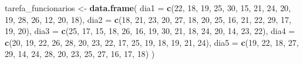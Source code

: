 \documentclass[
]{book}
\newenvironment{Shaded}{\begin{snugshade}}{\end{snugshade}}
\newcommand{\AttributeTok}[1]{\textcolor[rgb]{0.13,0.29,0.53}{#1}}
\newcommand{\DecValTok}[1]{\textcolor[rgb]{0.00,0.00,0.81}{#1}}
\newcommand{\FunctionTok}[1]{\textcolor[rgb]{0.13,0.29,0.53}{\textbf{#1}}}
\newcommand{\NormalTok}[1]{#1}
\newcommand{\OtherTok}[1]{\textcolor[rgb]{0.56,0.35,0.01}{#1}}
\begin{document}
\begin{Shaded}
\begin{Highlighting}[]
\NormalTok{tarefa\_funcionarios }\OtherTok{\textless{}{-}} \FunctionTok{data.frame}\NormalTok{(}
  \AttributeTok{dia1 =} \FunctionTok{c}\NormalTok{(}\DecValTok{22}\NormalTok{, }\DecValTok{18}\NormalTok{, }\DecValTok{19}\NormalTok{, }\DecValTok{25}\NormalTok{, }\DecValTok{30}\NormalTok{, }\DecValTok{15}\NormalTok{, }\DecValTok{21}\NormalTok{, }\DecValTok{24}\NormalTok{, }\DecValTok{20}\NormalTok{, }\DecValTok{19}\NormalTok{, }\DecValTok{28}\NormalTok{, }\DecValTok{26}\NormalTok{, }\DecValTok{12}\NormalTok{, }\DecValTok{20}\NormalTok{, }\DecValTok{18}\NormalTok{),}
  \AttributeTok{dia2 =} \FunctionTok{c}\NormalTok{(}\DecValTok{18}\NormalTok{, }\DecValTok{21}\NormalTok{, }\DecValTok{23}\NormalTok{, }\DecValTok{20}\NormalTok{, }\DecValTok{27}\NormalTok{, }\DecValTok{18}\NormalTok{, }\DecValTok{20}\NormalTok{, }\DecValTok{25}\NormalTok{, }\DecValTok{16}\NormalTok{, }\DecValTok{21}\NormalTok{, }\DecValTok{22}\NormalTok{, }\DecValTok{29}\NormalTok{, }\DecValTok{17}\NormalTok{, }\DecValTok{19}\NormalTok{, }\DecValTok{20}\NormalTok{),}
  \AttributeTok{dia3 =} \FunctionTok{c}\NormalTok{(}\DecValTok{25}\NormalTok{, }\DecValTok{17}\NormalTok{, }\DecValTok{15}\NormalTok{, }\DecValTok{18}\NormalTok{, }\DecValTok{26}\NormalTok{, }\DecValTok{16}\NormalTok{, }\DecValTok{19}\NormalTok{, }\DecValTok{30}\NormalTok{, }\DecValTok{21}\NormalTok{, }\DecValTok{18}\NormalTok{, }\DecValTok{24}\NormalTok{, }\DecValTok{20}\NormalTok{, }\DecValTok{14}\NormalTok{, }\DecValTok{23}\NormalTok{, }\DecValTok{22}\NormalTok{),}
  \AttributeTok{dia4 =} \FunctionTok{c}\NormalTok{(}\DecValTok{20}\NormalTok{, }\DecValTok{19}\NormalTok{, }\DecValTok{22}\NormalTok{, }\DecValTok{26}\NormalTok{, }\DecValTok{28}\NormalTok{, }\DecValTok{20}\NormalTok{, }\DecValTok{23}\NormalTok{, }\DecValTok{22}\NormalTok{, }\DecValTok{17}\NormalTok{, }\DecValTok{25}\NormalTok{, }\DecValTok{19}\NormalTok{, }\DecValTok{18}\NormalTok{, }\DecValTok{19}\NormalTok{, }\DecValTok{21}\NormalTok{, }\DecValTok{24}\NormalTok{),}
  \AttributeTok{dia5 =} \FunctionTok{c}\NormalTok{(}\DecValTok{19}\NormalTok{, }\DecValTok{22}\NormalTok{, }\DecValTok{18}\NormalTok{, }\DecValTok{27}\NormalTok{, }\DecValTok{29}\NormalTok{, }\DecValTok{14}\NormalTok{, }\DecValTok{24}\NormalTok{, }\DecValTok{28}\NormalTok{, }\DecValTok{20}\NormalTok{, }\DecValTok{23}\NormalTok{, }\DecValTok{25}\NormalTok{, }\DecValTok{27}\NormalTok{, }\DecValTok{16}\NormalTok{, }\DecValTok{17}\NormalTok{, }\DecValTok{18}\NormalTok{)}
\NormalTok{)}
\end{Highlighting}
\end{Shaded}
\end{document}
